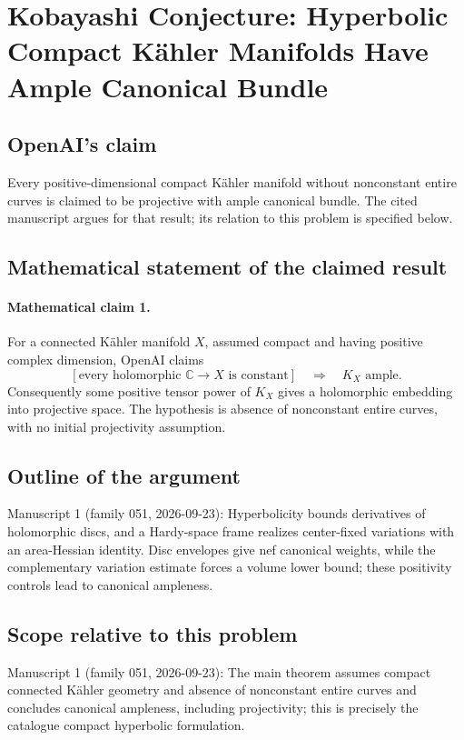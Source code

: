 \documentclass[11pt]{article}
\begin{document}
\section*{Kobayashi Conjecture: Hyperbolic Compact Kähler Manifolds Have Ample Canonical Bundle}

\subsection{OpenAI's claim}
Every positive-dimensional compact Kähler manifold without nonconstant entire curves is claimed to be projective with ample canonical bundle. The cited manuscript argues for that result; its relation to this problem is specified below.

\subsection{Mathematical statement of the claimed result}
\paragraph{Mathematical claim 1.} For a connected Kähler manifold $X$, assumed compact and having positive complex dimension, OpenAI claims
\[
[\text{every holomorphic }\mathbb C\to X\text{ is constant}]\quad\Longrightarrow\quad K_X\text{ ample}.
\]
Consequently some positive tensor power of $K_X$ gives a holomorphic embedding into projective space. The hypothesis is absence of nonconstant entire curves, with no initial projectivity assumption.

\subsection{Outline of the argument}
Manuscript 1 (family 051, 2026-09-23): Hyperbolicity bounds derivatives of holomorphic discs, and a Hardy-space frame realizes center-fixed variations with an area-Hessian identity. Disc envelopes give nef canonical weights, while the complementary variation estimate forces a volume lower bound; these positivity controls lead to canonical ampleness.

\subsection{Scope relative to this problem}
Manuscript 1 (family 051, 2026-09-23): The main theorem assumes compact connected Kähler geometry and absence of nonconstant entire curves and concludes canonical ampleness, including projectivity; this is precisely the catalogue compact hyperbolic formulation.
\end{document}
